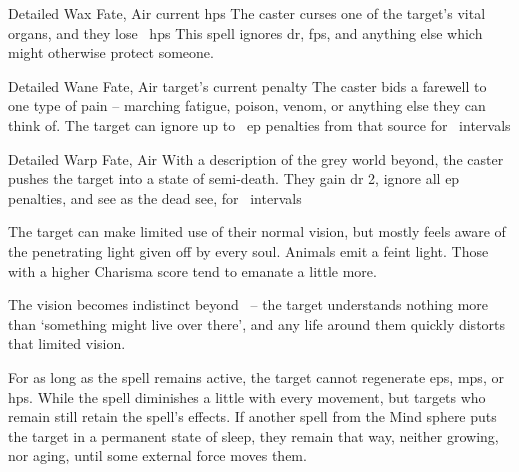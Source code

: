 \ifodd\value{diceNo}
  {Detailed}%
  {Wax}%
  {Fate, Air}%
  {current \glspl{hp}}%
  {The caster curses one of the target's vital organs, and they lose ~\glspl{hp}}%
  {This spell ignores \gls{dr}, \glspl{fp}, and anything else which might otherwise protect someone.}

\else

  {Detailed}%
  {Wane}%
  {Fate, Air}%
  {target's current  penalty}%
  {The caster bids a farewell to one type of pain -- marching fatigue, poison, venom, or anything else they can think of.
  The target can ignore up to ~\gls{ep} penalties from that source for ~\glspl{interval}}%
  {}

  {Detailed}%
  {Warp}%
  {Fate, Air}%
  {}%
  {With a description of the grey world beyond, the caster pushes the target into a state of semi-death.
  They gain \gls{dr} 2, ignore all \gls{ep} penalties, and see as the dead see, for ~\glspl{interval}}%
  {
    The target can make limited use of their normal vision, but mostly feels aware of the penetrating light given off by every soul.
    Animals emit a feint light.
    Those with a higher Charisma score tend to emanate a little more.

    The vision becomes indistinct beyond \spellRange\ -- the target understands nothing more than `something might live over there', and any life around them quickly distorts that limited vision.

    For as long as the spell remains active, the target cannot regenerate \glspl{ep}, \glspl{mp}, or \glspl{hp}.
    While the spell diminishes a little with every movement, but targets who remain still retain the spell's effects.
    If another spell from the Mind sphere puts the target in a permanent state of sleep, they remain that way, neither growing, nor aging, until some external force moves them.
  }

\fi
{}
